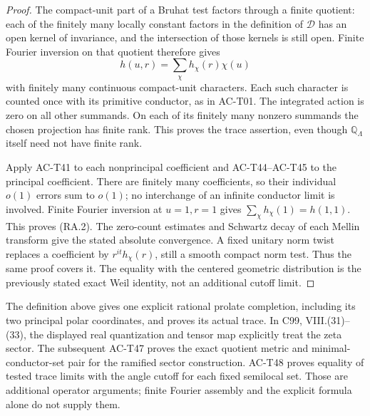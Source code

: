 \begin{proof}
The compact-unit part of a Bruhat test factors
through a finite quotient: each of the finitely
many locally constant factors in the definition
of \(\mathcal D\) has an open kernel of invariance,
and the intersection of those kernels is still
open.  Finite Fourier inversion on that quotient
therefore gives
\[
            h(u,r)=\sum_\chi h_\chi(r)\chi(u)
\]
with finitely many continuous compact-unit
characters.  Each such character is counted
once with its primitive conductor, as in AC-T01.
The integrated action is zero on all other
summands.  On each of its finitely many
nonzero summands the chosen projection has
finite rank.  This proves the trace assertion,
even though \(\mathbb Q_\Lambda\) itself need
not have finite rank.

Apply AC-T41 to each nonprincipal coefficient
and AC-T44--AC-T45 to the principal coefficient.
There are finitely many coefficients, so their
individual \(o(1)\) errors sum to \(o(1)\);
no interchange of an infinite conductor limit
is involved.  Finite Fourier inversion at
\(u=1,r=1\) gives
\(\sum_\chi h_\chi(1)=h(1,1)\).
This proves (RA.2).
The zero-count estimates and Schwartz decay
of each Mellin transform give the stated
absolute convergence.
A fixed unitary norm twist replaces a coefficient
by \(r^{it}h_\chi(r)\), still a smooth compact
norm test.  Thus the same proof covers it.
The equality with the centered geometric
distribution is the previously stated exact
Weil identity, not an additional cutoff limit.
\end{proof}

\begin{remark}
The definition above gives one explicit rational
prolate completion, including its two principal
polar coordinates, and proves its actual trace.
In C99, VIII.(31)--(33), the displayed real
quantization and tensor map explicitly treat
the zeta sector.  The subsequent AC-T47 proves
the exact quotient metric and minimal-conductor-set
pair for the ramified sector construction.
AC-T48 proves equality of tested trace limits
with the angle cutoff for each fixed semilocal set.
Those are additional operator arguments; finite
Fourier assembly and the explicit formula alone
do not supply them.
\end{remark}

